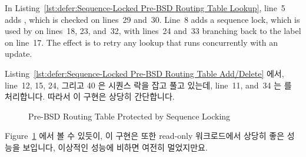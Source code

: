 In
Listing~\ref{lst:defer:Sequence-Locked Pre-BSD Routing Table Lookup},
line~5 adds , which is checked on lines~29 and~30.
Line~8 adds a sequence lock, which is used by 
on lines~18, 23, and~32, with lines~24 and~33 branching back to
the  label on line~17.
The effect is to retry any lookup that runs concurrently with an update.
\fi

Listing~\ref{lst:defer:Sequence-Locked Pre-BSD Routing Table Add/Delete} 에서,
line~12, 15, 24, 그리고 40 은 시퀀스 락을 잡고 풀고 있는데, line~11, and~34 는
 를 처리합니다.
따라서 이 구현은 상당히 간단합니다.

\begin{figure}[tb]
\centering
{}
\caption{Pre-BSD Routing Table Protected by Sequence Locking}
\label{fig:defer:Pre-BSD Routing Table Protected by Sequence Locking}
\end{figure}

Figure~\ref{fig:defer:Pre-BSD Routing Table Protected by Sequence Locking} 에서 볼 수 있듯이,
이 구현은 또한 read-only 워크로드에서 상당히 좋은 성능을 보입니다, 이상적인 성능에 비하면 여전히 멀었지만요.


